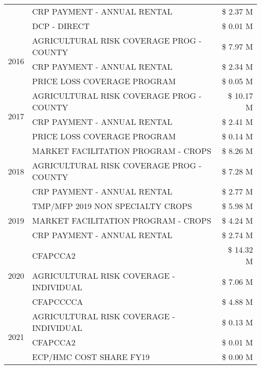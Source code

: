 \begin{tabular}{llr}
 & CRP PAYMENT - ANNUAL RENTAL & \$ 2.37 M \\
 & DCP - DIRECT & \$ 0.01 M \\
\cline{1-3}
\multirow[t]{3}{*}{2016} & AGRICULTURAL RISK COVERAGE PROG - COUNTY & \$ 7.97 M \\
 & CRP PAYMENT - ANNUAL RENTAL & \$ 2.34 M \\
 & PRICE LOSS COVERAGE PROGRAM & \$ 0.05 M \\
\cline{1-3}
\multirow[t]{3}{*}{2017} & AGRICULTURAL RISK COVERAGE PROG - COUNTY & \$ 10.17 M \\
 & CRP PAYMENT - ANNUAL RENTAL & \$ 2.41 M \\
 & PRICE LOSS COVERAGE PROGRAM & \$ 0.14 M \\
\cline{1-3}
\multirow[t]{3}{*}{2018} & MARKET FACILITATION PROGRAM - CROPS & \$ 8.26 M \\
 & AGRICULTURAL RISK COVERAGE PROG - COUNTY & \$ 7.28 M \\
 & CRP PAYMENT - ANNUAL RENTAL & \$ 2.77 M \\
\cline{1-3}
\multirow[t]{3}{*}{2019} & TMP/MFP 2019 NON SPECIALTY CROPS & \$ 5.98 M \\
 & MARKET FACILITATION PROGRAM - CROPS & \$ 4.24 M \\
 & CRP PAYMENT - ANNUAL RENTAL & \$ 2.74 M \\
\cline{1-3}
\multirow[t]{3}{*}{2020} & CFAPCCA2 & \$ 14.32 M \\
 & AGRICULTURAL RISK COVERAGE - INDIVIDUAL & \$ 7.06 M \\
 & CFAPCCCCA & \$ 4.88 M \\
\cline{1-3}
\multirow[t]{3}{*}{2021} & AGRICULTURAL RISK COVERAGE - INDIVIDUAL & \$ 0.13 M \\
 & CFAPCCA2 & \$ 0.01 M \\
 & ECP/HMC COST SHARE FY19 & \$ 0.00 M \\
\cline{1-3}
\bottomrule
\end{tabular}
